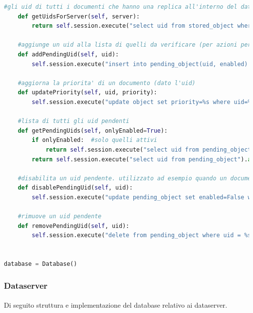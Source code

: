 \documentclass[11pt,a4paper,english]{article}
\begin{document}
\begin{lstlisting}[language=Python, title=Codice]
    #gli uid di tutti i documenti che hanno una replica all'interno del dataserver specificato
    def getUidsForServer(self, server):
        return self.session.execute("select uid from stored_object where server = %s allow filtering", (server, ))

    #aggiunge un uid alla lista di quelli da verificare (per azioni periodiche)
    def addPendingUid(self, uid):
        self.session.execute("insert into pending_object(uid, enabled) values (%s, True)", (uid, ))

    #aggiorna la priorita' di un documento (dato l'uid)
    def updatePriority(self, uid, priority):
        self.session.execute("update object set priority=%s where uid=%s", (priority, uid))

    #lista di tutti gli uid pendenti
    def getPendingUids(self, onlyEnabled=True):
        if onlyEnabled:  #solo quelli attivi
            return self.session.execute("select uid from pending_object where enabled=True allow filtering").all()
        return self.session.execute("select uid from pending_object").all()

    #disabilita un uid pendente. utilizzato ad esempio quando un documento va replicato ma non ci sono dataserver disponibili.
    def disablePendingUid(self, uid):
        self.session.execute("update pending_object set enabled=False where uid = %s", (uid, ))

    #rimuove un uid pendente
    def removePendingUid(self, uid):
        self.session.execute("delete from pending_object where uid = %s", (uid, ))


database = Database()
\end{lstlisting}



\subsubsection{Dataserver}

\paragraph{} Di seguito struttura e implementazione del database relativo ai dataserver.
\end{document}

